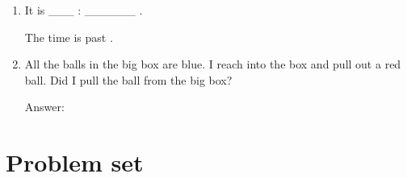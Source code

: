 \documentclass{tufte-book}
\begin{document}
\begin{enumerate}
\item {}
 It is \_\_\_ : \_\_\_\_\_\_ . \bigskip\par
 The time is \dotfill past \dotfill\medskip.
 
\item All the balls in the big box are blue. I reach into the box and pull out a red ball. Did I pull the ball from the big box?\medskip\par
Answer: \dotfill\medskip
\end{enumerate}

\clearpage\section{Problem set }
\end{document}
